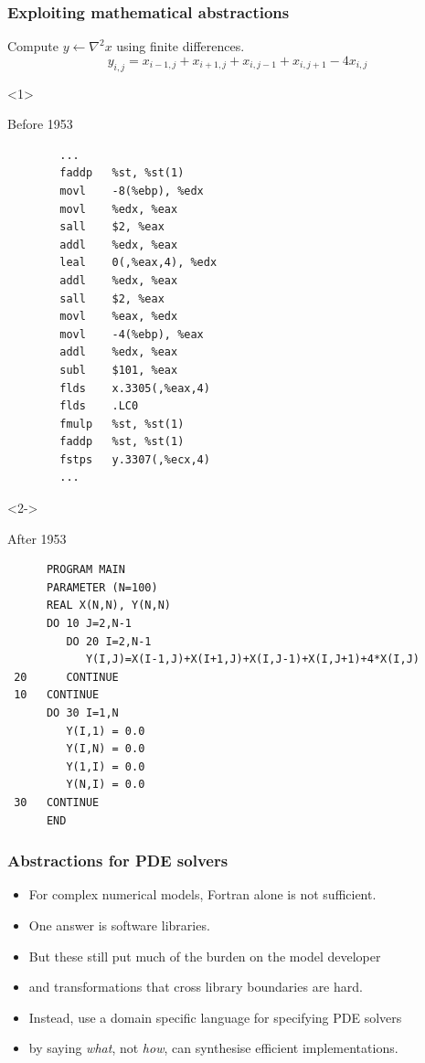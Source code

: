 \documentclass[presentation]{beamer}
\begin{document}
\begin{frame}[fragile]
  \frametitle{Exploiting mathematical abstractions}
  Compute $y \leftarrow \nabla^2 x$ using finite differences.
  \begin{equation*}
    y_{i,j} = x_{i-1, j} + x_{i+1, j} + x_{i, j-1} + x_{i, j+1} - 4x_{i,j}    
  \end{equation*}
  \begin{overlayarea}{\textwidth}{0.8\textheight}
  \begin{onlyenv}<1>
    \begin{block}{Before 1953}
\begin{verbatim}
        ...
        faddp   %st, %st(1)
        movl    -8(%ebp), %edx
        movl    %edx, %eax
        sall    $2, %eax
        addl    %edx, %eax
        leal    0(,%eax,4), %edx
        addl    %edx, %eax
        sall    $2, %eax
        movl    %eax, %edx
        movl    -4(%ebp), %eax
        addl    %edx, %eax
        subl    $101, %eax
        flds    x.3305(,%eax,4)
        flds    .LC0
        fmulp   %st, %st(1)
        faddp   %st, %st(1)
        fstps   y.3307(,%ecx,4)
        ...
\end{verbatim}
    \end{block}
  \end{onlyenv}
  \begin{onlyenv}<2->
    \begin{block}{After 1953}
\begin{verbatim}
      PROGRAM MAIN
      PARAMETER (N=100)
      REAL X(N,N), Y(N,N)
      DO 10 J=2,N-1
         DO 20 I=2,N-1
            Y(I,J)=X(I-1,J)+X(I+1,J)+X(I,J-1)+X(I,J+1)+4*X(I,J)
 20      CONTINUE
 10   CONTINUE
      DO 30 I=1,N
         Y(I,1) = 0.0
         Y(I,N) = 0.0
         Y(1,I) = 0.0
         Y(N,I) = 0.0
 30   CONTINUE
      END
\end{verbatim}
    \end{block}
  \end{onlyenv}
  \end{overlayarea}
\end{frame}

\begin{frame}
  \frametitle{Abstractions for PDE solvers}
  \begin{itemize}
  \item For complex numerical models, Fortran alone is not sufficient.
  \item One answer is software libraries.
  \item But these still put much of the burden on the model developer
  \item and transformations that cross library boundaries are hard.
  \item Instead, use a domain specific language for specifying PDE
    solvers
  \item by saying \emph{what}, not \emph{how}, can synthesise
    efficient implementations.
  \end{itemize}
\end{frame}
\end{document}
